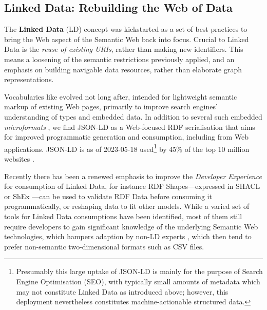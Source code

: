 \subsection{Linked Data: Rebuilding the Web of Data}\label{ch3:ld-web}

The \textbf{Linked Data} (\acrshort{LD}) concept \cite{Bizer 2009} was kickstarted as a set of best practices \cite{Berners-Lee 2006} to bring the Web aspect of the Semantic Web back into focus. Crucial to Linked Data is the \emph{reuse of existing URIs}, rather than making new identifiers. This means a loosening of the semantic restrictions previously applied, and an emphasis on building navigable data resources, rather than elaborate graph representations.

Vocabularies like  evolved not long after, intended for lightweight semantic markup of existing Web pages, primarily to improve search engines' understanding of types and embedded data. In addition to several such embedded \emph{microformats} \cite{Open Graph,Sporny 2015,WHATWG 2023}, we find \acrfull{JSON-LD} \cite{Sporny 2020} as a Web-focused RDF serialisation that aims for improved programmatic generation and consumption, including from Web applications. JSON-LD is as of 2023-05-18 used\footnote{Presumably this large uptake of JSON-LD is mainly for the purpose of Search Engine Optimisation (SEO), with typically small amounts of metadata which may not constitute Linked Data as introduced above; however, this deployment nevertheless constitutes machine-actionable structured data.} by 45\% of the top 10 million websites \cite{W3Techs 2023}.

Recently there has been a renewed emphasis to improve the \emph{Developer Experience} \cite{Verborgh 2018} for consumption of Linked Data, for instance RDF Shapes---expressed in SHACL \cite{Kontokostas 2017} or ShEx \cite{Baker 2019}---can be used to validate RDF Data \cite{Labra Gayo 2017,Thornton 2019} before consuming it programmatically, or reshaping data to fit other models. While a varied set of tools for Linked Data consumptions have been identified, most of them still require developers to gain significant knowledge of the underlying Semantic Web technologies, which hampers adaption by non-LD experts \cite{Klímek 2019}, which then tend to prefer non-semantic two-dimensional formats such as CSV files.


